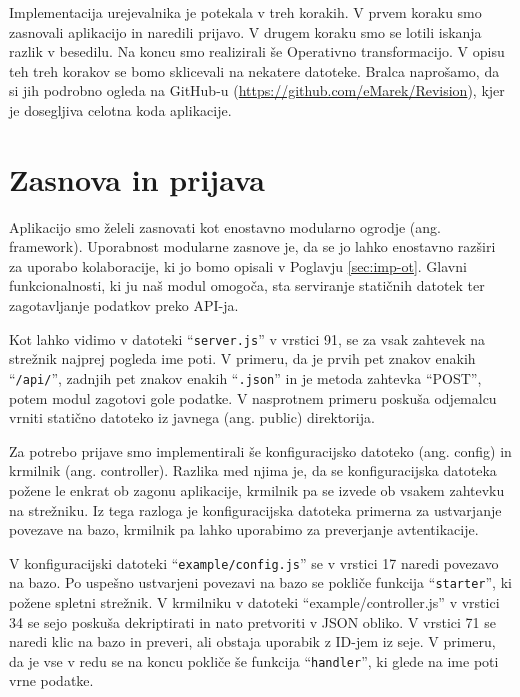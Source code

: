 \documentclass[a4paper, 12pt, twoside]{book}
\begin{document}
Implementacija urejevalnika je potekala v treh korakih. V prvem koraku smo zasnovali aplikacijo in naredili prijavo. V drugem koraku smo se lotili iskanja razlik v besedilu. Na koncu smo realizirali še Operativno transformacijo. V opisu teh treh korakov se bomo sklicevali na nekatere datoteke. Bralca naprošamo, da si jih podrobno ogleda na GitHub-u (\url{https://github.com/eMarek/Revision}), kjer je dosegljiva celotna koda aplikacije.

\section{Zasnova in prijava}

Aplikacijo smo želeli zasnovati kot enostavno modularno ogrodje (ang. framework). Uporabnost modularne zasnove je, da se jo lahko enostavno razširi za uporabo kolaboracije, ki jo bomo opisali v Poglavju \ref{sec:imp-ot}. Glavni funkcionalnosti, ki ju naš modul omogoča, sta serviranje statičnih datotek ter zagotavljanje podatkov preko API-ja.

Kot lahko vidimo v datoteki “{\tt server.js}” v vrstici 91, se za vsak zahtevek na strežnik najprej pogleda ime poti. V primeru, da je prvih pet znakov enakih “{\tt /api/}”, zadnjih pet znakov enakih “{\tt .json}” in je metoda zahtevka “POST”, potem modul zagotovi gole podatke. V nasprotnem primeru poskuša odjemalcu vrniti statično datoteko iz javnega (ang. public) direktorija.

Za potrebo prijave smo implementirali še konfiguracijsko datoteko (ang. config) in krmilnik (ang. controller). Razlika med njima je, da se konfiguracijska datoteka požene le enkrat ob zagonu aplikacije, krmilnik pa se izvede ob vsakem zahtevku na strežniku. Iz tega razloga je konfiguracijska datoteka primerna za ustvarjanje povezave na bazo, krmilnik pa lahko uporabimo za preverjanje avtentikacije.

V konfiguracijski datoteki “{\tt example/config.js}” se v vrstici 17 naredi povezavo na bazo. Po uspešno ustvarjeni povezavi na bazo se pokliče funkcija “{\tt starter}”, ki požene spletni strežnik. V krmilniku v datoteki “{example/controller.js}” v vrstici 34 se sejo poskuša dekriptirati in nato pretvoriti v JSON obliko. V vrstici 71 se naredi klic na bazo in preveri, ali obstaja uporabik z ID-jem iz seje. V primeru, da je vse v redu se na koncu pokliče še funkcija “{\tt handler}”, ki glede na ime poti vrne podatke.
\end{document}
